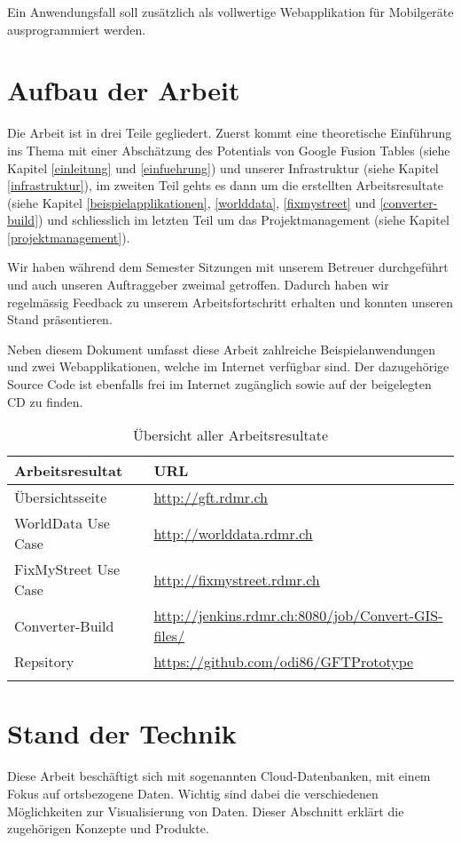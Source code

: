 Ein Anwendungsfall soll zusätzlich als vollwertige Webapplikation für Mobilgeräte ausprogrammiert werden.

\section{Aufbau der Arbeit}
Die Arbeit ist in drei Teile gegliedert. Zuerst kommt eine theoretische Einführung ins Thema mit einer Abschätzung des Potentials von Google Fusion Tables (siehe Kapitel \ref{einleitung} und \ref{einfuehrung}) und unserer Infrastruktur (siehe Kapitel \ref{infrastruktur}), im zweiten Teil gehts es dann um die erstellten Arbeitsresultate (siehe Kapitel \ref{beispielapplikationen}, \ref{worlddata}, \ref{fixmystreet} und \ref{converter-build}) und schliesslich im letzten Teil um das Projektmanagement (siehe Kapitel \ref{projektmanagement}).

Wir haben während dem Semester Sitzungen mit unserem Betreuer durchgeführt und auch unseren Auftraggeber zweimal getroffen. Dadurch haben wir regelmässig Feedback zu unserem Arbeitsfortschritt erhalten und konnten unseren Stand präsentieren.

Neben diesem Dokument umfasst diese Arbeit zahlreiche Beispielanwendungen und zwei Webapplikationen, welche im Internet verfügbar sind. Der dazugehörige Source Code ist ebenfalls frei im Internet zugänglich sowie auf der beigelegten CD zu finden.

\begin{longtable}{|l|l|}
\hline 
\textbf{Arbeitsresultat} & \textbf{URL} \\ 
\hline 
Übersichtsseite & \url{http://gft.rdmr.ch} \\ 
\hline 
WorldData Use Case & \url{http://worlddata.rdmr.ch} \\ 
\hline 
FixMyStreet Use Case & \url{http://fixmystreet.rdmr.ch} \\ 
\hline 
Converter-Build & \url{http://jenkins.rdmr.ch:8080/job/Convert-GIS-files/} \\ 
\hline 
Repsitory & \url{https://github.com/odi86/GFTPrototype} \\ 
\hline 
\caption{Übersicht aller Arbeitsresultate}
\label{arbeitsresultate}
\end{longtable} 

\section{Stand der Technik}
Diese Arbeit beschäftigt sich mit sogenannten \gls{Cloud}-Datenbanken, mit einem Fokus auf ortsbezogene Daten. Wichtig sind dabei die verschiedenen Möglichkeiten zur Visualisierung von Daten. Dieser Abschnitt erklärt die zugehörigen Konzepte und Produkte.

